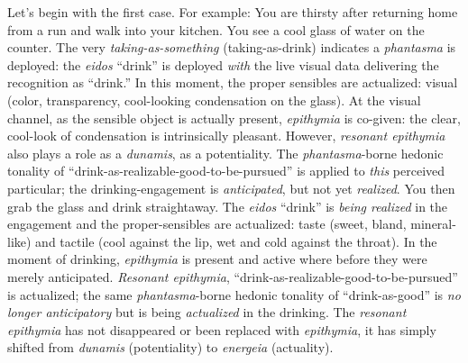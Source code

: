 \documentclass{article}
\begin{document}
Let's begin with the first case. For example: You are thirsty after returning home from a run and walk into your kitchen. You see a cool glass of water on the counter. The very \textit{taking-as-something} (taking-as-drink) indicates a \textit{phantasma} is deployed: the \textit{eidos} ``drink'' is deployed \textit{with} the live visual data delivering the recognition as ``drink.'' In this moment, the proper sensibles are actualized: visual (color, transparency, cool-looking condensation on the glass). At the visual channel, as the sensible object is actually present, \textit{epithymia} is co-given: the clear, cool-look of condensation is intrinsically pleasant. However, \textit{resonant epithymia} also plays a role as a \textit{dunamis}, as a potentiality. The \textit{phantasma}-borne hedonic tonality of ``drink-as-realizable-good-to-be-pursued'' is applied to \textit{this} perceived particular; the drinking-engagement is \textit{anticipated}, but not yet \textit{realized}. You then grab the glass and drink straightaway. The \textit{eidos} ``drink'' is \textit{being realized} in the engagement and the proper-sensibles are actualized: taste (sweet, bland, mineral-like) and tactile (cool against the lip, wet and cold against the throat). In the moment of drinking, \textit{epithymia} is present and active where before they were merely anticipated. \textit{Resonant epithymia}, ``drink-as-realizable-good-to-be-pursued'' is actualized; the same \textit{phantasma}-borne hedonic tonality of ``drink-as-good'' is \textit{no longer anticipatory} but is being \textit{actualized} in the drinking. The \textit{resonant epithymia} has not disappeared or been replaced with \textit{epithymia}, it has simply shifted from \textit{dunamis} (potentiality) to \textit{energeia} (actuality). 
\end{document}
